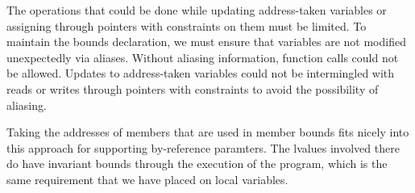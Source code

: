 The operations that could be done while updating
address-taken variables or assigning through pointers with 
constraints on them must be limited.
To maintain the bounds declaration, we must ensure that
variables are not modified unexpectedly via aliases. 
Without aliasing information, function calls could not
be allowed.  Updates to address-taken variables could
not be intermingled with reads or writes through pointers
with constraints to avoid the possibility of aliasing.

Taking the addresses of members that are used in member
bounds fits nicely into this approach for supporting
by-reference paramters.  The lvalues involved there do have
invariant bounds through the execution of the program,
which is the same requirement that we have placed on
local variables.